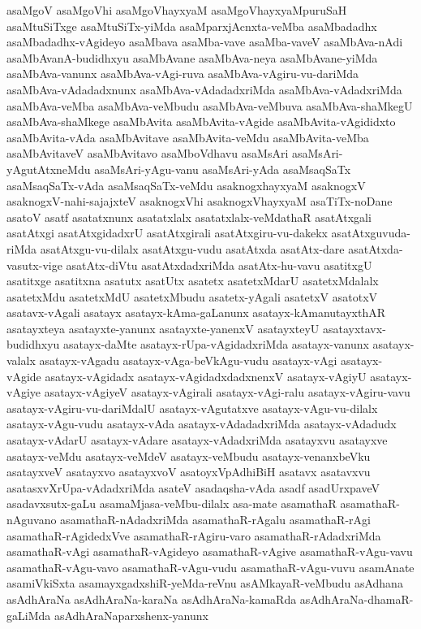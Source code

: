 {asaMgoV
asaMgoVhi
asaMgoVhayxyaM
asaMgoVhayxyaMpuruSaH
asaMtuSiTxge
asaMtuSiTx-yiMda
asaMparxjAcnxta-veMba
asaMbadadhx
asaMbadadhx-vAgideyo
asaMbava
asaMba-vave
asaMba-vaveV
asaMbAva-nAdi
asaMbAvanA-budidhxyu
asaMbAvane
asaMbAva-neya
asaMbAvane-yiMda
asaMbAva-vanunx
asaMbAva-vAgi-ruva
asaMbAva-vAgiru-vu-dariMda
asaMbAva-vAdadadxnunx
asaMbAva-vAdadadxriMda
asaMbAva-vAdadxriMda
asaMbAva-veMba
asaMbAva-veMbudu
asaMbAva-veMbuva
asaMbAva-shaMkegU
asaMbAva-shaMkege
asaMbAvita
asaMbAvita-vAgide
asaMbAvita-vAgididxto
asaMbAvita-vAda
asaMbAvitave
asaMbAvita-veMdu
asaMbAvita-veMba
asaMbAvitaveV
asaMbAvitavo
asaMboVdhavu
asaMsAri
asaMsAri-yAgutAtxneMdu
asaMsAri-yAgu-vanu
asaMsAri-yAda
asaMsaqSaTx
asaMsaqSaTx-vAda
asaMsaqSaTx-veMdu
asaknogxhayxyaM
asaknogxV
asaknogxV-nahi-sajajxteV
asaknogxVhi
asaknogxVhayxyaM
asaTiTx-noDane
asatoV
asatf
asatatxnunx
asatatxlalx
asatatxlalx-veMdathaR
asatAtxgali
asatAtxgi
asatAtxgidadxrU
asatAtxgirali
asatAtxgiru-vu-dakekx
asatAtxguvuda-riMda
asatAtxgu-vu-dilalx
asatAtxgu-vudu
asatAtxda
asatAtx-dare
asatAtxda-vasutx-vige
asatAtx-diVtu
asatAtxdadxriMda
asatAtx-hu-vavu
asatitxgU
asatitxge
asatitxna
asatutx
asatUtx
asatetx
asatetxMdarU
asatetxMdalalx
asatetxMdu
asatetxMdU
asatetxMbudu
asatetx-yAgali
asatetxV
asatotxV
asatavx-vAgali
asatayx
asatayx-kAma-gaLanunx
asatayx-kAmanutayxthAR
asatayxteya
asatayxte-yanunx
asatayxte-yanenxV
asatayxteyU
asatayxtavx-budidhxyu
asatayx-daMte
asatayx-rUpa-vAgidadxriMda
asatayx-vanunx
asatayx-valalx
asatayx-vAgadu
asatayx-vAga-beVkAgu-vudu
asatayx-vAgi
asatayx-vAgide
asatayx-vAgidadx
asatayx-vAgidadxdadxnenxV
asatayx-vAgiyU
asatayx-vAgiye
asatayx-vAgiyeV
asatayx-vAgirali
asatayx-vAgi-ralu
asatayx-vAgiru-vavu
asatayx-vAgiru-vu-dariMdalU
asatayx-vAgutatxve
asatayx-vAgu-vu-dilalx
asatayx-vAgu-vudu
asatayx-vAda
asatayx-vAdadadxriMda
asatayx-vAdadudx
asatayx-vAdarU
asatayx-vAdare
asatayx-vAdadxriMda
asatayxvu
asatayxve
asatayx-veMdu
asatayx-veMdeV
asatayx-veMbudu
asatayx-venanxbeVku
asatayxveV
asatayxvo
asatayxvoV
asatoyxVpAdhiBiH
asatavx
asatavxvu
asatasxvXrUpa-vAdadxriMda
asateV
asadaqsha-vAda
asadf
asadUrxpaveV
asadavxsutx-gaLu
asamaMjasa-veMbu-dilalx
asa-mate
asamathaR
asamathaR-nAguvano
asamathaR-nAdadxriMda
asamathaR-rAgalu
asamathaR-rAgi
asamathaR-rAgidedxVve
asamathaR-rAgiru-varo
asamathaR-rAdadxriMda
asamathaR-vAgi
asamathaR-vAgideyo
asamathaR-vAgive
asamathaR-vAgu-vavu
asamathaR-vAgu-vavo
asamathaR-vAgu-vudu
asamathaR-vAgu-vuvu
asamAnate
asamiVkiSxta
asamayxgadxshiR-yeMda-reVnu
asAMkayaR-veMbudu
asAdhana
asAdhAraNa
asAdhAraNa-karaNa
asAdhAraNa-kamaRda
asAdhAraNa-dhamaR-gaLiMda
asAdhAraNaparxshenx-yanunx
}
